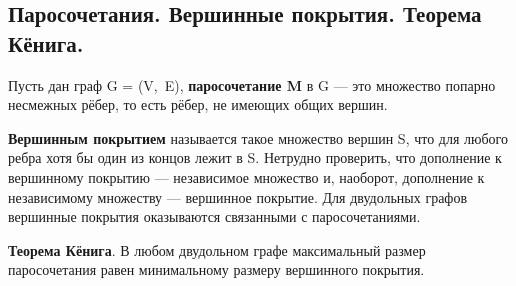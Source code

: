 \subsection{Паросочетания. Вершинные покрытия. Теорема Кёнига.}


Пусть дан граф G = (V,\ E), \textbf{паросочетание M} в G — это множество попарно несмежных рёбер, то есть рёбер, не имеющих общих вершин.

\textbf{Вершинным покрытием} называется такое множество вершин S, что для любого ребра хотя бы один из концов лежит в S. Нетрудно проверить, что дополнение к вершинному покрытию — независимое множество и, наоборот, дополнение к независимому множеству — вершинное покрытие. Для двудольных графов вершинные покрытия оказываются связанными с паросочетаниями.


\textbf{Теорема Кёнига}. В любом двудольном графе максимальный размер паросочетания равен минимальному размеру вершинного покрытия.

